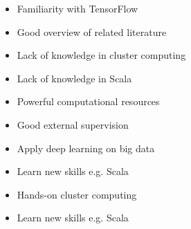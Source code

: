 \documentclass[paper=a4, fontsize=10pt,margin=0.2in]{scrartcl}
\newenvironment{myitemize}{%
    \begin{itemize}[leftmargin=0pt] \footnotesize }%
    {\end{itemize}}
\numberwithin{equation}{section}		%
\numberwithin{figure}{section}			%
\numberwithin{table}{section}				%
\begin{document}
\begin{tcbraster}[raster columns=3, raster equal height, raster column skip=0mm, raster row skip=0mm, 
]
\begin{tcolorbox}[blankest]\end{tcolorbox}
\begin{tcolorbox}[mybox={S}{helpful!50!internal}]
\begin{myitemize} %
\item Familiarity with TensorFlow
\item Good overview of related literature

\end{myitemize}
\end{tcolorbox} 
\begin{tcolorbox}[mybox={W}{harmful!50!internal}]
\begin{myitemize} %
\item Lack of knowledge in cluster computing
\item Lack of knowledge in Scala 

\end{myitemize}
\end{tcolorbox}
\begin{tcolorbox}[mybox={O}{helpful!50!external}]
\begin{myitemize} %
\item Powerful computational resources
\item Good external supervision 

\end{myitemize}
\end{tcolorbox}
\begin{tcolorbox}[mybox={}{SO}]
\begin{myitemize} %
\item Apply deep learning on big data
\item Learn new skills e.g. Scala

\end{myitemize}
\end{tcolorbox}
\begin{tcolorbox}[mybox={}{WO}]
\begin{myitemize}
\item Hands-on cluster computing
\item Learn new skills e.g. Scala


\end{myitemize}
\end{tcolorbox}
\end{tcbraster}
\end{document}
